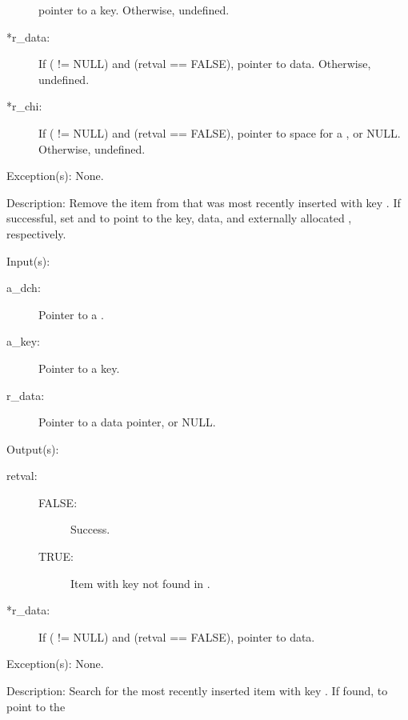 \begin{capi}
\begin{capilist}
\begin{description}
			pointer to a key.  Otherwise, undefined.
		\item[*r\_data: ]
			If ( != NULL) and (retval == FALSE),
			pointer to data.  Otherwise, undefined.
		\item[*r\_chi: ]
			If ( != NULL) and (retval == FALSE),
			pointer to space for a , or NULL.
			Otherwise, undefined.
		\end{description}
	\item[Exception(s): ] None.
	\item[Description: ]
		Remove the item from  that was most recently
		inserted with key .  If successful, set
		 and  to point to the key, data,
		and externally allocated , respectively.
	\end{capilist}
\label{dch_search}
	\begin{capilist}
	\item[Input(s): ]
		\begin{description}\item[]
		\item[a\_dch: ]
			Pointer to a .
		\item[a\_key: ]
			Pointer to a key.
		\item[r\_data: ]
			Pointer to a data pointer, or NULL.
		\end{description}
	\item[Output(s): ]
		\begin{description}\item[]
		\item[retval: ]
			\begin{description}\item[]
			\item[FALSE: ]
				Success.
			\item[TRUE: ]
				Item with key  not found in
				.
			\end{description}
		\item[*r\_data: ]
			If ( != NULL) and (retval == FALSE),
			pointer to data.
		\end{description}
	\item[Exception(s): ] None.
	\item[Description: ]
		Search for the most recently inserted item with key
		.  If found,  to point to the

\end{capilist}
\end{capi}
